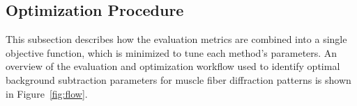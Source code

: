 \documentclass[iucr]{iucrjournals}
\begin{document}







\subsection{Optimization Procedure}
\label{sec:optimization_procedure}

This subsection describes how the evaluation metrics are combined into a single objective function, which is minimized to tune each method's parameters. An overview of the evaluation and optimization workflow used to identify optimal background subtraction parameters for muscle fiber diffraction patterns is shown in Figure~\ref{fig:flow}.
\end{document}

